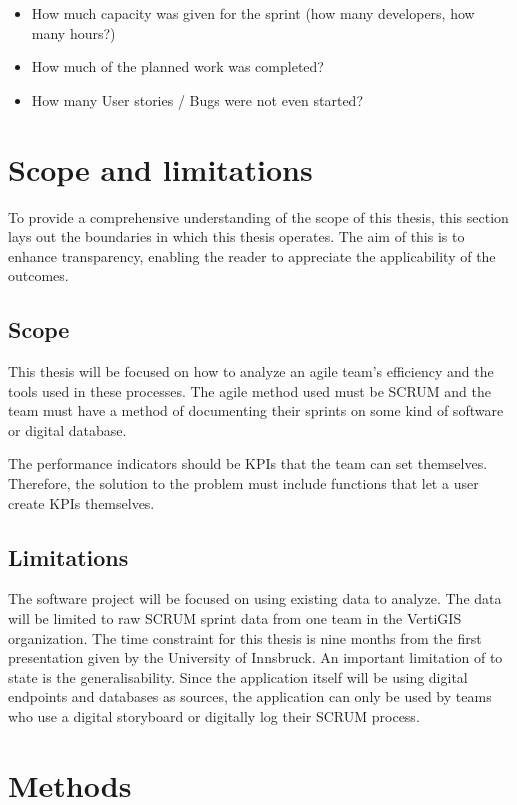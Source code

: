 \begin{itemize}
    \item How much capacity was given for the sprint (how many developers, how many hours?)
    \item How much of the planned work was completed?
    \item How many User stories / Bugs were not even started?
\end{itemize}

\section{Scope and limitations}

To provide a comprehensive understanding of the scope of this thesis, 
this section lays out the boundaries in which this thesis operates. 
The aim of this is to enhance transparency, enabling the reader to appreciate the applicability of the outcomes.

\subsection{Scope}

This thesis will be focused on how to analyze an agile team's efficiency and the tools used in these processes. 
The agile method used must be SCRUM and the team must have a method of documenting 
their sprints on some kind of software or digital database. 

The performance indicators should be KPIs that the team can set themselves. 
Therefore, the solution to the problem must include functions that let a user create KPIs themselves.

\subsection{Limitations}

The software project will be focused on using existing data to analyze. 
The data will be limited to raw SCRUM sprint data from one team in the VertiGIS organization.
The time constraint for this thesis is nine months from the first presentation given by the University of Innsbruck. 
An important limitation of to state is the generalisability. Since the application itself will be using digital endpoints 
and databases as sources, the application can only be used by teams who use a digital storyboard or digitally log their SCRUM process.


\section{Methods} \label{introduction-methods}

